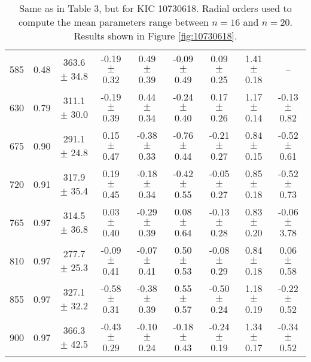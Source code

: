 \documentclass[twocolumn]{aastex61}%
\begin{document}
\begin{table*}[ht]
\begin{tabular}{ccc|ccccc|c}
585 & 0.48 & 363.6 $\pm$ 34.8 & -0.19 $\pm$ 0.32 & 0.49 $\pm$ 0.39 & -0.09 $\pm$ 0.49 & 0.09 $\pm$ 0.25 & 1.41 $\pm$ 0.18 & --\\
630 & 0.79 & 311.1 $\pm$ 30.0 & -0.19 $\pm$ 0.39 & 0.44 $\pm$ 0.34 & -0.24 $\pm$ 0.40 & 0.17 $\pm$ 0.26 & 1.17 $\pm$ 0.14 & -0.13 $\pm$ 0.82\\
675 & 0.90 & 291.1 $\pm$ 24.8 & 0.15 $\pm$ 0.47 & -0.38 $\pm$ 0.33 & -0.76 $\pm$ 0.44 & -0.21 $\pm$ 0.27 & 0.84 $\pm$ 0.15 & -0.52 $\pm$ 0.61\\
720 & 0.91 & 317.9 $\pm$ 35.4 & 0.19 $\pm$ 0.45 & -0.18 $\pm$ 0.34 & -0.42 $\pm$ 0.55 & -0.05 $\pm$ 0.27 & 0.85 $\pm$ 0.18 & -0.52 $\pm$ 0.73\\
765 & 0.97 & 314.5 $\pm$ 36.8 & 0.03 $\pm$ 0.40 & -0.29 $\pm$ 0.39 & 0.08 $\pm$ 0.64 & -0.13 $\pm$ 0.28 & 0.83 $\pm$ 0.20 & -0.06 $\pm$ 3.78\\
810 & 0.97 & 277.7 $\pm$ 25.3 & -0.09 $\pm$ 0.41 & -0.07 $\pm$ 0.41 & 0.50 $\pm$ 0.53 & -0.08 $\pm$ 0.29 & 0.84 $\pm$ 0.18 & 0.06 $\pm$ 0.58\\
855 & 0.97 & 327.1 $\pm$ 32.2 & -0.58 $\pm$ 0.31 & -0.38 $\pm$ 0.39 & 0.55 $\pm$ 0.57 & -0.50 $\pm$ 0.24 & 1.18 $\pm$ 0.19 & -0.22 $\pm$ 0.52\\
900 & 0.97 & 366.3 $\pm$ 42.5 & -0.43 $\pm$ 0.29 & -0.10 $\pm$ 0.24 & -0.18 $\pm$ 0.43 & -0.24 $\pm$ 0.19 & 1.34 $\pm$ 0.17 & -0.34 $\pm$ 0.52\\
\end{tabular}
\caption{Same as in Table 3, but for KIC 10730618. Radial orders used to compute the mean parameters range between $n=16$ and $n=20$. Results shown in Figure \ref{fig:10730618}.}\label{tab:10730618}
\end{table*}
\end{document}
